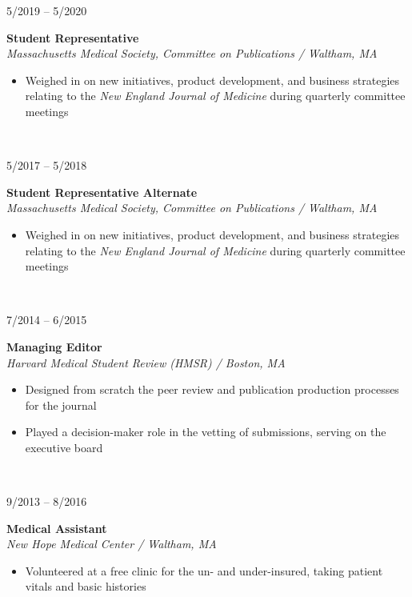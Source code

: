 \documentclass{book}
\newcommand\colleft{.20}
\newcommand\colright{.75}
\newcommand{\entryfour}[4]
	{
		\begin{minipage}[t]{\colleft\textwidth}
		\hfill \textsc{#1}
		\end{minipage}
		\hfill\vline\hfill
		\begin{minipage}[t]{\colright\textwidth}
		{\bf#2}\\
		\textit{#3}
		\footnotesize{#4}
		\end{minipage}\\
		\entryvspace
	}%
\newcommand{\entryvspace}{\vspace{0.5em}}
\begin{document}
	\entryfour{5/2019 -- 5/2020}{Student Representative}{Massachusetts Medical Society, Committee on Publications / Waltham, MA}{%
		\begin{itemize}
			\item Weighed in on new initiatives, product development, and business strategies relating to the \emph{New England Journal of Medicine} during quarterly committee meetings
		\end{itemize}
	}

	\entryfour{5/2017 -- 5/2018}{Student Representative Alternate}{Massachusetts Medical Society, Committee on Publications / Waltham, MA}{%
	\begin{itemize}
		\item Weighed in on new initiatives, product development, and business strategies relating to the \emph{New England Journal of Medicine} during quarterly committee meetings
	\end{itemize}
}

	\entryfour{7/2014 -- 6/2015}{Managing Editor}{Harvard Medical Student Review (HMSR) / Boston, MA}{%
	\begin{itemize}
		\item Designed from scratch the peer review and publication production processes for the journal
		\item Played a decision-maker role in the vetting of submissions, serving on the executive board
	\end{itemize}
	}

	\entryfour{9/2013 -- 8/2016}{Medical Assistant}{New Hope Medical Center / Waltham, MA}{%
	\begin{itemize}
		\item Volunteered at a free clinic for the un- and under-insured, taking patient vitals and basic histories
	\end{itemize}
	}
\end{document}
